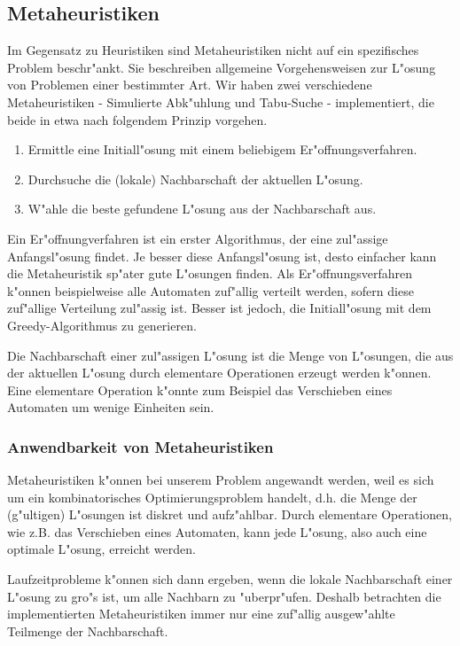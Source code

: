 \subsection{Metaheuristiken}
Im Gegensatz zu Heuristiken sind Metaheuristiken nicht auf ein spezifisches Problem beschr"ankt. Sie beschreiben allgemeine Vorgehensweisen zur L"osung von Problemen einer bestimmter Art. Wir haben zwei verschiedene Metaheuristiken - Simulierte Abk"uhlung und Tabu-Suche - implementiert, die beide in etwa nach folgendem Prinzip vorgehen.
\begin{enumerate}
\item Ermittle eine Initiall"osung mit einem beliebigem Er"offnungsverfahren.
\item Durchsuche die (lokale) Nachbarschaft der aktuellen L"osung.
\item W"ahle die beste gefundene L"osung aus der Nachbarschaft aus.
\end{enumerate}
Ein Er"offnungverfahren ist ein erster Algorithmus, der eine zul"assige Anfangsl"osung findet. Je besser diese Anfangsl"osung ist, desto einfacher kann die Metaheuristik sp"ater gute L"osungen finden. Als Er"offnungsverfahren k"onnen beispielweise alle Automaten zuf"allig verteilt werden, sofern diese zuf"allige Verteilung zul"assig ist. Besser ist jedoch, die Initiall"osung mit dem Greedy-Algorithmus zu generieren. 

Die Nachbarschaft einer zul"assigen L"osung ist die Menge von L"osungen, die aus der aktuellen L"osung durch elementare Operationen erzeugt werden k"onnen. Eine elementare Operation k"onnte zum Beispiel das Verschieben eines Automaten um wenige Einheiten sein. 

\subsubsection{Anwendbarkeit von Metaheuristiken}
Metaheuristiken k"onnen bei unserem Problem angewandt werden, weil es sich um ein kombinatorisches Optimierungsproblem handelt, d.h. die Menge der (g"ultigen) L"osungen ist diskret und aufz"ahlbar. Durch elementare Operationen, wie z.B. das Verschieben eines Automaten, kann jede L"osung, also auch eine optimale L"osung, erreicht werden.

Laufzeitprobleme k"onnen sich dann ergeben, wenn die lokale Nachbarschaft einer L"osung zu gro"s ist, um alle Nachbarn zu "uberpr"ufen. Deshalb betrachten die implementierten Metaheuristiken immer nur eine zuf"allig ausgew"ahlte Teilmenge der Nachbarschaft. 

